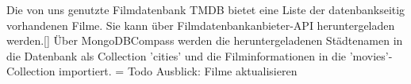 \noindent
Die von uns genutzte Filmdatenbank TMDB bietet eine Liste der datenbankseitig vorhandenen Filme. Sie kann über Filmdatenbankanbieter-API heruntergeladen werden.[]
\newline
Über MongoDBCompass werden die heruntergeladenen Städtenamen in die Datenbank als Collection 'cities' und die Filminformationen in die 'movies'-Collection importiert.
\newline
=\> Todo Ausblick: Filme aktualisieren
